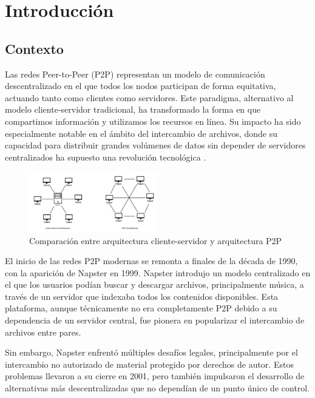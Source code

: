\chapter{Introducción}
\label{cap:introduccion}


\section{Contexto}

Las redes Peer-to-Peer (P2P) representan un modelo de comunicación descentralizado en el que todos los nodos participan de forma equitativa, actuando tanto como clientes como servidores.
Este paradigma, alternativo al modelo cliente-servidor tradicional, ha transformado la forma en que compartimos información y utilizamos los recursos en línea.
Su impacto ha sido especialmente notable en el ámbito del intercambio de archivos,
donde su capacidad para distribuir grandes volúmenes de datos sin depender de servidores centralizados ha supuesto una revolución tecnológica \cite{schollmeier2001}.


\begin{figure}[h]
    \centering
    \includegraphics[width = 0.5\textwidth]{Imagenes/Vectorial/client-server-vs-p2p}
    \caption{Comparaci\'on entre arquitectura cliente-servidor y arquitectura P2P}
    \label{fig:clientVsp2p}
\end{figure}


El inicio de las redes P2P modernas se remonta a finales de la década de 1990, con la aparición de Napster en 1999.
Napster introdujo un modelo centralizado en el que los usuarios podían buscar y descargar archivos, principalmente música, a través de un servidor que indexaba todos los contenidos disponibles.
Esta plataforma, aunque técnicamente no era completamente P2P debido a su dependencia de un servidor central,
fue pionera en popularizar el intercambio de archivos entre pares.


Sin embargo, Napster enfrentó múltiples desafíos legales, principalmente por el intercambio no autorizado de material protegido por derechos de autor.
Estos problemas llevaron a su cierre en 2001, pero también impulsaron el desarrollo de alternativas más descentralizadas que no dependían de un punto único de control.


